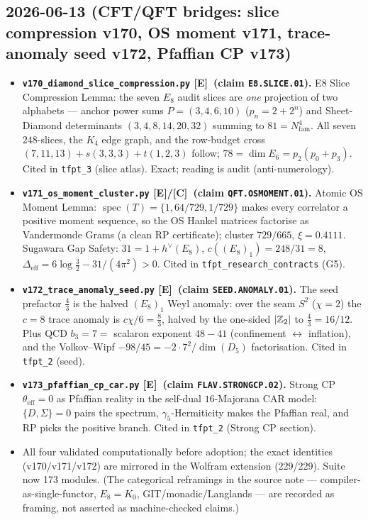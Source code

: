 \documentclass[11pt]{article}
\providecommand{\mE}{\textbf{[E]}}\providecommand{\mC}{\textbf{[C]}}
\begin{document}
\subsection*{2026-06-13 (CFT/QFT bridges: slice compression v170, OS moment v171, trace-anomaly seed v172, Pfaffian CP v173)}
\begin{itemize}
\item \textbf{\texttt{v170\_diamond\_slice\_compression.py} \mE\ (claim \texttt{E8.SLICE.01}).}
  E8 Slice Compression Lemma: the seven $E_8$ audit slices are \emph{one} projection of two
  alphabets --- anchor power sums $P=(3,4,6,10)$ ($p_n=2+2^n$) and Sheet-Diamond determinants
  $(3,4,8,14,20,32)$ summing to $81=N_{\mathrm{fam}}^4$. All seven $248$-slices, the $K_4$ edge
  graph, and the row-budget cross $(7,11,13)+s(3,3,3)+t(1,2,3)$ follow; $78=\dim E_6=p_2(p_0+p_3)$.
  Cited in \texttt{tfpt\_3} (slice atlas). Exact; reading is audit (anti-numerology).
\item \textbf{\texttt{v171\_os\_moment\_cluster.py} \mE/\mC\ (claim \texttt{QFT.OSMOMENT.01}).}
  Atomic OS Moment Lemma: $\operatorname{spec}(T)=\{1,64/729,1/729\}$ makes every correlator a
  positive moment sequence, so the OS Hankel matrices factorise as Vandermonde Grams (a clean RP
  certificate); cluster $729/665$, $\xi=0.4111$. Sugawara Gap Safety: $31=1+h^\vee(E_8)$,
  $c((E_8)_1)=248/31=8$, $\Delta_{\mathrm{eff}}=6\log\tfrac32-31/(4\pi^2)>0$. Cited in
  \texttt{tfpt\_research\_contracts} (G5).
\item \textbf{\texttt{v172\_trace\_anomaly\_seed.py} \mE\ (claim \texttt{SEED.ANOMALY.01}).}
  The seed prefactor $\tfrac43$ is the halved $(E_8)_1$ Weyl anomaly: over the seam $S^2$ ($\chi=2$)
  the $c=8$ trace anomaly is $c\chi/6=\tfrac83$, halved by the one-sided $|\mathbb{Z}_2|$ to
  $\tfrac43=16/12$. Plus QCD $b_3=7=$ scalaron exponent $48-41$ (confinement $\leftrightarrow$
  inflation), and the Volkov--Wipf $-98/45=-2\cdot7^2/\dim(D_5)$ factorisation. Cited in
  \texttt{tfpt\_2} (seed).
\item \textbf{\texttt{v173\_pfaffian\_cp\_car.py} \mE\ (claim \texttt{FLAV.STRONGCP.02}).}
  Strong CP $\theta_{\mathrm{eff}}=0$ as Pfaffian reality in the self-dual $16$-Majorana CAR model:
  $\{D,\Sigma\}=0$ pairs the spectrum, $\gamma_5$-Hermiticity makes the Pfaffian real, and RP picks
  the positive branch. Cited in \texttt{tfpt\_2} (Strong CP section).
\item All four validated computationally before adoption; the exact identities (v170/v171/v172) are
  mirrored in the Wolfram extension (229/229). Suite now 173 modules. (The categorical reframings
  in the source note --- compiler-as-single-functor, $E_8=K_0$, GIT/monadic/Langlands --- are
  recorded as framing, not asserted as machine-checked claims.)
\end{itemize}
\end{document}
